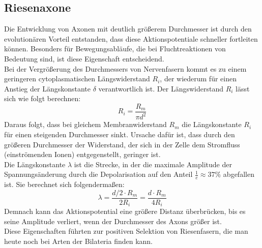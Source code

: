\documentclass[11pt]{article}
\begin{document}
\subsection{Riesenaxone}
Die Entwicklung von Axonen mit deutlich größerem Durchmesser ist durch den evolutionären Vorteil entstanden, dass diese Aktionspotentiale schneller fortleiten können. Besonders für Bewegungsabläufe, die bei Fluchtreaktionen von Bedeutung sind, ist diese Eigenschaft entscheidend. \\
Bei der Vergrößerung des Durchmessers von Nervenfasern kommt es zu einem geringeren cytoplasmatischen Längswiderstand $R_i$, der wiederum für einen Anstieg der Längskonstante $\delta$ verantwortlich ist. Der Längswiderstand $R_i$ lässt sich wie folgt berechnen:
\begin{equation}
\label{eq1}
R_i = \dfrac{R_m}{\pi d^2}
\end{equation}
Daraus folgt, dass bei gleichem Membranwiderstand $R_m$ die Längskonstante $R_i$ für einen steigenden Durchmesser sinkt. Ursache dafür ist, dass durch den größeren Durchmesser der Widerstand, der sich in der Zelle dem Stromfluss (einströmenden Ionen) entgegenstellt, geringer ist. \\
Die Längskonstante $\lambda$ ist die Strecke, in der die maximale Amplitude der Spannungsänderung durch die Depolarisation auf den Anteil $\frac{1}{e} \approx 37\%$ abgefallen ist.  \cite{physiologie} Sie berechnet sich folgendermaßen:
\begin{equation}
\label{eq2}
\lambda = \dfrac{d/2 \cdot R_m}{2 R_i} = \dfrac{d \cdot R_m}{4 R_i}
\end{equation}
Demnach kann das Aktionspotential eine größere Distanz überbrücken, bis es seine Amplitude verliert, wenn der Durchmesser des Axons größer ist. \\
Diese Eigenschaften führten zur positiven Selektion von Riesenfasern, die man heute noch bei Arten der Bilateria finden kann. 
\end{document}
